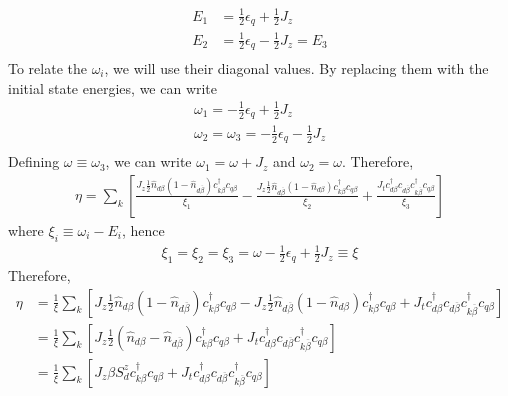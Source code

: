 \documentclass[twoside,11pt]{report}
\numberwithin{equation}{section}
\begin{document}
\begin{equation}\begin{aligned}
	E_1 &= \frac{1}{2}\epsilon_q + \frac{1}{2}J_z\\
	E_2 &= \frac{1}{2}\epsilon_q - \frac{1}{2}J_z = E_3\\
\end{aligned}\end{equation}
To relate the \(\omega_i\), we will use their diagonal values. By replacing them with the initial state energies, we can write
\begin{equation}\begin{aligned}
	\omega_1 = - \frac{1}{2}\epsilon_q + \frac{1}{2}J_z\\
	\omega_2 = \omega_3 = - \frac{1}{2}\epsilon_q - \frac{1}{2}J_z\\
\end{aligned}\end{equation}
Defining \(\omega \equiv \omega_3\), we can write \(\omega_1 = \omega + J_z\) and \(\omega_2 = \omega\). Therefore,
\begin{equation}\begin{aligned}
	\eta = \sum_k \left[\frac{ J_z \frac{1}{2}\hat n_{d\beta}\left( 1 - \hat n_{d\overline\beta} \right) c^\dagger_{k\beta}c_{q\beta}}{\xi_1} - \frac{J_z \frac{1}{2}\hat n_{d\overline\beta}\left( 1 - \hat n_{d\beta} \right) c^\dagger_{k\beta}c_{q\beta}}{\xi_2} + \frac{J_t  c^\dagger_{d\beta}c_{d\overline\beta} c^\dagger_{k\overline\beta}c_{q\beta}}{\xi_3}\right] 
\end{aligned}\end{equation}
where \(\xi_i \equiv \omega_i - E_i\), hence
\begin{equation}\begin{aligned}
	\xi_1 = \xi_2 = \xi_3 = \omega - \frac{1}{2}\epsilon_q + \frac{1}{2}J_z \equiv \xi
\end{aligned}\end{equation}
Therefore,
\begin{equation}\begin{aligned}
	\eta &= \frac{1}{\xi}\sum_k \left[ J_z \frac{1}{2}\hat n_{d\beta}\left( 1 - \hat n_{d\overline\beta} \right) c^\dagger_{k\beta}c_{q\beta} - J_z \frac{1}{2}\hat n_{d\overline\beta}\left( 1 - \hat n_{d\beta} \right) c^\dagger_{k\beta}c_{q\beta} + J_t  c^\dagger_{d\beta}c_{d\overline\beta} c^\dagger_{k\overline\beta}c_{q\beta}\right] \\
	     &= \frac{1}{\xi}\sum_k \left[ J_z \frac{1}{2}\left(\hat n_{d\beta} - \hat n_{d\overline\beta}\right) c^\dagger_{k\beta}c_{q\beta} + J_t  c^\dagger_{d\beta}c_{d\overline\beta} c^\dagger_{k\overline\beta}c_{q\beta}\right]\\
	     &= \frac{1}{\xi}\sum_k \left[ J_z \beta S_d^z c^\dagger_{k\beta}c_{q\beta} + J_t  c^\dagger_{d\beta}c_{d\overline\beta} c^\dagger_{k\overline\beta}c_{q\beta}\right]
\end{aligned}\end{equation}
\end{document}
